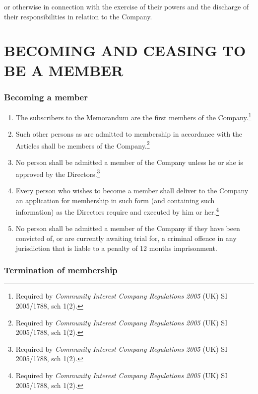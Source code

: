 \documentclass[a4paper,12pt]{article}
\begin{document}
or otherwise in connection with the exercise of their powers and the discharge of their responsibilities in relation to the Company.

\part*{BECOMING AND CEASING TO BE A MEMBER}

\section{Becoming a member}

\begin{enumerate}
  \color{red}
  \item The subscribers to the Memorandum are the first members of the Company.\footnote{Required by \textit{Community Interest Company Regulations 2005} (UK) SI 2005/1788, sch 1(2).}
  \item Such other persons as are admitted to membership in accordance with the Articles shall be members of the Company.\footnote{Required by \textit{Community Interest Company Regulations 2005} (UK) SI 2005/1788, sch 1(2).}
  \item No person shall be admitted a member of the Company unless he or she is approved by the Directors.\footnote{Required by \textit{Community Interest Company Regulations 2005} (UK) SI 2005/1788, sch 1(2).}
  \item Every person who wishes to become a member shall deliver to the Company an application for membership in such form (and containing such information) as the Directors require and executed by him or her.\footnote{Required by \textit{Community Interest Company Regulations 2005} (UK) SI 2005/1788, sch 1(2).}\color{black}
  \item No person shall be admitted a member of the Company if they have been convicted of, or are currently awaiting trial for, a criminal offence in any jurisdiction that is liable to a penalty of 12 months imprisonment.
\end{enumerate}

\section{Termination of membership}
\end{document}
